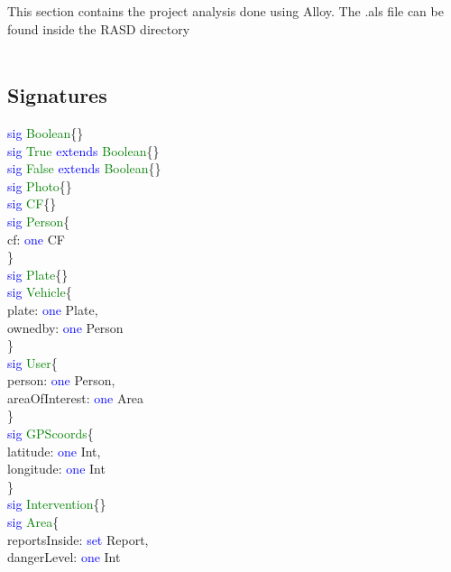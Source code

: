 
This section contains the project analysis done using Alloy. The .als file can be found inside the RASD directory \\
\\
\subsection{Signatures}
\textcolor{blue}{sig}
\textcolor{green}{Boolean}\{\} \\
\textcolor{blue}{sig}
\textcolor{green}{True}
\textcolor{blue}{extends}
\textcolor{green}{Boolean}\{\} \\ 
\textcolor{blue}{sig}
\textcolor{green}{False}
\textcolor{blue}{extends}
\textcolor{green}{Boolean}\{\} \\
\textcolor{blue}{sig}
\textcolor{green}{Photo}\{\} \\
\textcolor{blue}{sig}
\textcolor{green}{CF}\{\} \\
\textcolor{blue}{sig}
\textcolor{green}{Person}\{ \\
cf: \textcolor{blue}{one} CF\\
\} \\
\textcolor{blue}{sig}
\textcolor{green}{Plate}\{\} \\
\textcolor{blue}{sig}
\textcolor{green}{Vehicle}\{ \\
plate: \textcolor{blue}{one} Plate,\\
ownedby: \textcolor{blue}{one} Person\\
\} \\
\textcolor{blue}{sig}
\textcolor{green}{User}\{ \\
person: \textcolor{blue}{one} Person,\\
areaOfInterest: \textcolor{blue}{one} Area\\ 
\} \\
\textcolor{blue}{sig}
\textcolor{green}{GPScoords}\{ \\
latitude: \textcolor{blue}{one} Int,\\
longitude: \textcolor{blue}{one} Int\\ 
\} \\
\textcolor{blue}{sig}
\textcolor{green}{Intervention}\{\} \\
\textcolor{blue}{sig}
\textcolor{green}{Area}\{ \\
reportsInside: \textcolor{blue}{set} Report,\\
dangerLevel: \textcolor{blue}{one} Int\\ 
